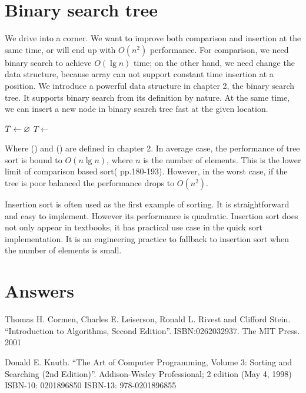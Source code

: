 \documentclass[b5paper]{article}
\begin{document}
\section{Binary search tree}

We drive into a corner. We want to improve both comparison and insertion at the same time, or will end up with $O(n^2)$ performance. For comparison, we need binary search to achieve $O(\lg n)$ time; on the other hand, we need change the data structure, because array can not support constant time insertion at a position. We introduce a powerful data structure in chapter 2, the binary search tree. It supports binary search from its definition by nature. At the same time, we can insert a new node in binary search tree fast at the given location.

\begin{algorithmic}[1]
  \State $T \gets \varnothing$
    \State $T \gets $ 
  \EndFor
  \State \Return {}
\EndFunction
\end{algorithmic}

Where () and () are defined in chapter 2. In average case, the performance of tree sort is bound to $O(n \lg n)$, where $n$ is the number of elements. This is the lower limit of comparison based sort(\cite{Knuth} pp.180-193). However, in the worst case, if the tree is poor balanced the performance drops to $O(n^2)$.

Insertion sort is often used as the first example of sorting. It is straightforward and easy to implement. However its performance is quadratic. Insertion sort does not only appear in textbooks, it has practical use case in the quick sort implementation. It is an engineering practice to fallback to insertion sort when the number of elements is small.

\ifx\wholebook\relax \else
\section{Answers}
\shipoutAnswer

\begin{thebibliography}{99}

Thomas H. Cormen, Charles E. Leiserson, Ronald L. Rivest and Clifford Stein.
``Introduction to Algorithms, Second Edition''. ISBN:0262032937. The MIT Press. 2001

Donald E. Knuth. ``The Art of Computer Programming, Volume 3: Sorting and Searching (2nd Edition)''. Addison-Wesley Professional; 2 edition (May 4, 1998) ISBN-10: 0201896850 ISBN-13: 978-0201896855

\end{thebibliography}
\end{document}
